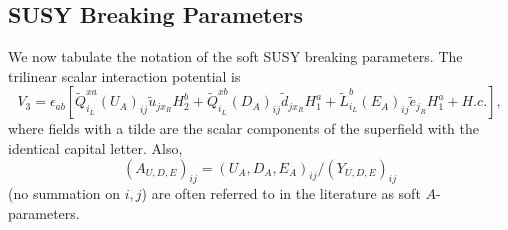 \documentclass{article}
\begin{document}
\subsection{SUSY Breaking Parameters \label{sec:susybreak}}
We now tabulate the notation of the soft SUSY breaking parameters. The
trilinear scalar interaction potential is
\begin{equation}
V_3 = \epsilon_{ab}
\left[
\tilde{Q}_{i_L}^{xa} (U_A)_{ij}  \tilde{u}_{jx_R} H_2^b + 
\tilde{Q}_{i_L}^{xb} (D_A)_{ij}  \tilde{d}_{jx_R} H_1^a + 
\tilde{L}_{i_L}^{b} (E_A)_{ij}  \tilde{e}_{j_R} H_1^a + H.c.\right],
\end{equation}
where fields with a tilde are the scalar components of the superfield with the
identical capital letter. 
Also,
\begin{equation}
(A_{U,D,E})_{ij} = (U_A,D_A,E_A)_{ij} / (Y_{U,D,E})_{ij} 
\end{equation}
(no summation on $i,j$) are often referred to in the literature as soft
$A$-parameters.
\end{document}
